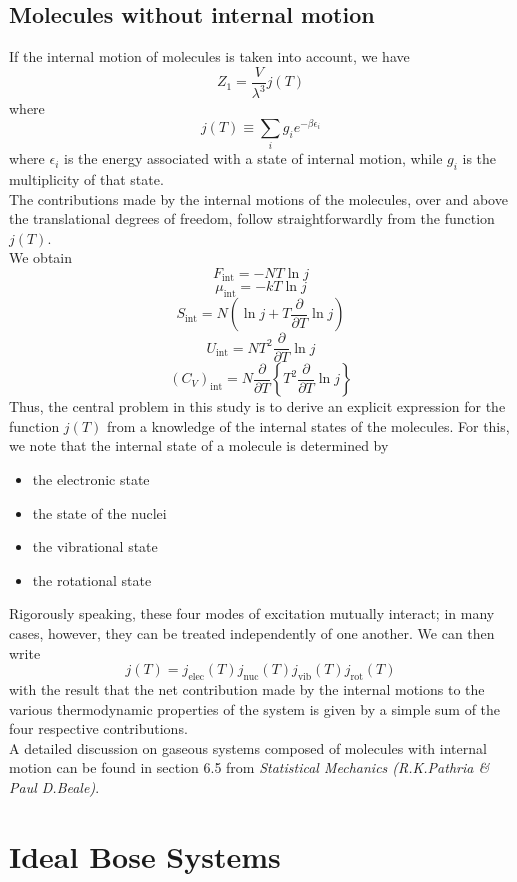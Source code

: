 \documentclass[cyan]{elegantnote}
\begin{document}
\subsection{Molecules without internal motion}
If the internal motion of molecules is taken into account, we have
\[Z_1 = \frac{V}{\lambda^3}j(T)\] 
where
\[j(T) \equiv \sum_i g_i e^{-\beta \epsilon_i}\] 
where $\epsilon_i$ is the energy associated with a state of internal motion, while $g_i$ is the multiplicity of that state.
\\
The contributions made by the internal motions of the molecules, over and above the translational degrees of freedom, follow straightforwardly from the function $j(T)$.
\\ 
We obtain
\[F_{\mathrm{int}} = -NT\ln j\] 
\[\mu_{\mathrm{int}} = -kT\ln j\] 
\[S_{\mathrm{int}} = N\left(\ln j + T \frac{\partial}{\partial T}\ln j\right)\] 
\[U_{\mathrm{int}} = NT^2 \frac{\partial}{\partial T}\ln j\] 
\[(C_V)_{\mathrm{int}} = N\frac{\partial}{\partial T} \left\{T^2 \frac{\partial}{\partial T} \ln j \right\} \]
Thus, the central problem in this study is to derive an explicit expression for the function $j(T)$ from a knowledge of the internal states of the molecules. For this, we note that the internal state of a molecule is determined by
\begin{itemize}
\item the electronic state
\item the state of the nuclei
\item the vibrational state
\item the rotational state
\end{itemize}
\indent
Rigorously speaking, these four modes of excitation mutually interact; in many cases, however, they can be treated independently of one another. We can then write
\[j(T) = j_{\mathrm{elec}}(T)j_{\mathrm{nuc}}(T)j_{\mathrm{vib}}(T)j_{\mathrm{rot}}(T)\] 
with the result that the net contribution made by the internal motions to the various thermodynamic properties of the system is given by a simple sum of the four respective contributions.
\\
A detailed discussion on gaseous systems composed of molecules with internal motion can be found in section 6.5 from \emph{Statistical Mechanics (R.K.Pathria \& Paul D.Beale)}.

\section{Ideal Bose Systems}
\end{document}
